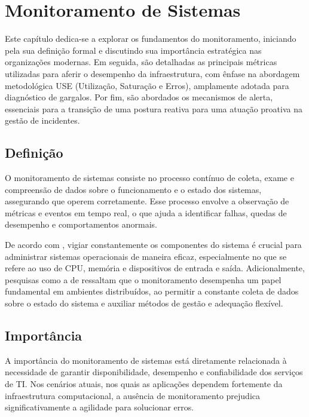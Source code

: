 \documentclass[
    12pt
    ,oneside
    ,a4paper
    ,chapter=TITLE
    ,section=TITLE
    ,sumario=abnt-6027-2012]{abntex2}
\begin{document}
\chapter{Monitoramento de Sistemas}
\label{cap:mon-sys}

Este capítulo dedica-se a explorar os fundamentos do monitoramento, iniciando pela sua definição formal e discutindo sua importância estratégica nas organizações modernas. Em seguida, são detalhadas as principais métricas utilizadas para aferir o  desempenho da infraestrutura, com ênfase na abordagem metodológica USE (Utilização, Saturação e Erros), amplamente adotada para diagnóstico de gargalos. Por fim, são abordados os mecanismos de alerta, essenciais para a transição de uma postura reativa para uma atuação proativa na gestão de incidentes.

\section{Definição}

O monitoramento de sistemas consiste no processo contínuo de coleta, exame e compreensão de dados sobre o funcionamento e o estado dos sistemas, assegurando que operem corretamente. Esse processo envolve a observação de métricas e eventos em tempo real, o que ajuda a identificar falhas, quedas de desempenho e comportamentos anormais.

De acordo com , vigiar constantemente os componentes do sistema é crucial para administrar sistemas operacionais de maneira eficaz, especialmente no que se refere ao uso de CPU, memória e dispositivos de entrada e saída. Adicionalmente, pesquisas como a de  ressaltam que o monitoramento desempenha um papel fundamental em ambientes distribuídos, ao permitir a constante coleta de dados sobre o estado do sistema e auxiliar métodos de gestão e adequação flexível.

\section{Importância}

A importância do monitoramento de sistemas está diretamente relacionada à necessidade de garantir disponibilidade, desempenho e confiabilidade dos serviços de TI. Nos cenários atuais, nos quais as aplicações dependem fortemente da infraestrutura computacional, a ausência de monitoramento prejudica significativamente a agilidade para solucionar erros.
\end{document}
